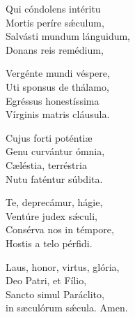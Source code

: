  Qui cóndolens intéritu\\ 
    Mortis períre sǽculum,\\  
    Salvásti mundum lánguidum,\\  
    Donans reis remédium, 

 Vergénte mundi véspere,\\  
    Uti sponsus de thálamo,\\  
    Egréssus honestíssima\\  
    Vírginis matris cláusula. 

 Cujus forti poténtiæ\\  
    Genu curvántur ómnia,\\  
    Cæléstia, terréstria\\  
     Nutu faténtur súbdita. 

 Te, deprecámur, hágie,\\  
    Ventúre judex sǽculi,\\  
    Consérva nos in témpore,\\  
    Hostis a telo pérfidi. 

 Laus, honor, virtus, glória,\\  
    Deo Patri, et Fílio,\\  
    Sancto simul Paráclito,\\  
    in sæculórum sǽcula. 
Amen.